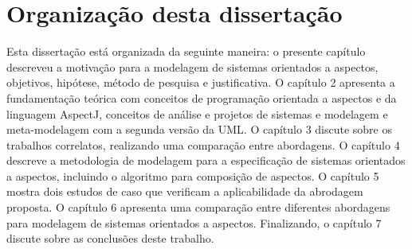 \section{Organização desta dissertação}

Esta dissertação está organizada da seguinte maneira: o presente capítulo descreveu a motivação para a modelagem de sistemas orientados a aspectos,
objetivos, hipótese, método de pesquisa e justificativa. O capítulo {2} apresenta a fundamentação teórica com conceitos de programação orientada a
aspectos e da linguagem AspectJ, conceitos de análise e projetos de sistemas e modelagem e meta-modelagem com a segunda versão da UML. O capítulo {3} 
discute sobre os trabalhos correlatos, realizando uma comparação entre abordagens. O capítulo {4} descreve a metodologia de modelagem
para a especificação de sistemas orientados a aspectos, incluindo o algoritmo para composição de aspectos. O capítulo {5} mostra dois estudos de caso
que verificam a aplicabilidade da abrodagem proposta. O capítulo {6} apresenta uma comparação entre diferentes abordagens para modelagem de sistemas orientados a aspectos. 
Finalizando, o capítulo {7} discute sobre as conclusões deste trabalho.
